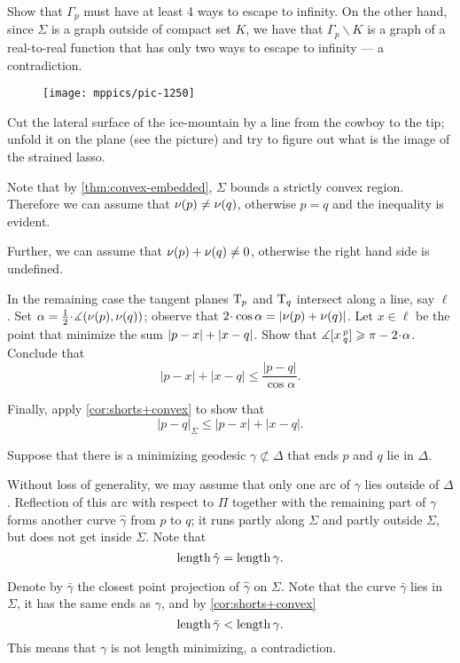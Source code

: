 Show that $\Gamma_p$ must have at least 4 ways to escape to infinity.
On the other hand, since $\Sigma$ is a graph outside of compact set $K$, we have that $\Gamma_p\backslash K$ is a graph of a real-to-real function that has only two ways to escape to infinity --- a contradiction.

\setcounter{eqtn}{0}

\begin{wrapfigure}[5]{r}{24 mm}
\vskip-0mm
\centering
\texttt{[image: mppics/pic-1250]}
\vskip-0mm
\end{wrapfigure}

Cut the lateral surface of the ice-mountain by a line from the cowboy to the tip;
unfold it on the plane (see the picture) and try to figure out what is the image of the strained lasso.

Note that by \ref{thm:convex-embedded}, $\Sigma$ bounds a strictly convex region.
Therefore we can assume that $\nu(p)\ne\nu(q)$, otherwise $p=q$ and the inequality is evident.

Further, we can assume that $\nu(p)+\nu(q)\ne 0$, otherwise the right hand side is undefined.


In the remaining case the tangent planes $\mathrm{T}_p$ and $\mathrm{T}_q$ intersect along a line, say $\ell$.
Set $\alpha=\tfrac12\cdot\measuredangle(\Norm(p),\Norm(q))$;
observe that $2\cdot\cos\alpha= |\Norm(p)+\Norm(q)|$.
Let $x\in \ell$ be the point that minimize the sum $|p-x|\z+|x-q|$.
Show that $\measuredangle\hinge xpq\ge \pi-2\cdot\alpha$.
Conclude that 
\[|p-x|+|x-q|\le \frac{|p-q|}{\cos\alpha}.\]

Finally, apply \ref{cor:shorts+convex} to show that
\[|p-q|_\Sigma\le |p-x|+|x-q|.\]


 Suppose that there is a minimizing geodesic $\gamma\not\subset\Delta$ that ends $p$ and $q$ lie in $\Delta$.

Without loss of generality, we may assume that only one arc of $\gamma$ lies outside of $\Delta$.
Reflection of this arc  with respect to $\Pi$ together with the remaining part of $\gamma$ forms another curve $\hat\gamma$ from $p$ to $q$;
it runs partly along $\Sigma$ 
and partly outside $\Sigma$,
but does not get inside $\Sigma$.
Note that
\[\mathop{\rm length}\nolimits\hat\gamma=\mathop{\rm length}\nolimits\gamma.\]


Denote by $\bar\gamma$ the closest point projection of $\hat\gamma$ on $\Sigma$.
Note that the curve $\bar\gamma$ lies in $\Sigma$, 
it has the same ends as $\gamma$,
and by \ref{cor:shorts+convex}
\[\mathop{\rm length}\nolimits\bar\gamma<\mathop{\rm length}\nolimits\gamma.\]
This means that $\gamma$ is not length minimizing, 
a contradiction.

